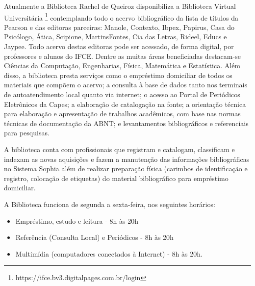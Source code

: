 \documentclass{paper}
\begin{document}
Atualmente a Biblioteca Rachel de Queiroz disponibiliza a Biblioteca Virtual Universitária \footnote{https://ifce.bv3.digitalpages.com.br/login} contemplando todo o acervo bibliográfico da lista de títulos da Pearson e das editoras parceiras: Manole, Contexto, Ibpex, Papirus, Casa do Psicólogo, Ática, Scipione, MartinsFontes, Cia das Letras, Rideel, Educs e Jaypee. Todo acervo destas editoras pode ser acessado, de forma digital, por professores e alunos do IFCE. Dentre as muitas áreas beneficiadas destacam-se Ciências da Computação, Engenharias, Física, Matemática e Estatística. Além disso, a biblioteca presta serviços como o empréstimo domiciliar de todos os materiais que compõem o acervo; a consulta à base de dados tanto nos terminais de autoatendimento local quanto via internet; o acesso ao Portal de Periódicos Eletrônicos da Capes; a elaboração de catalogação na fonte; a orientação técnica para elaboração e apresentação de trabalhos acadêmicos, com base nas normas técnicas de documentação da ABNT; e levantamentos bibliográficos e referenciais para pesquisas.

A biblioteca conta com profissionais que registram e catalogam, classificam e indexam as novas aquisições e fazem a manutenção das informações bibliográficas no Sistema Sophia além de realizar preparação física (carimbos de identificação e registro, colocação de etiquetas) do material bibliográfico para empréstimo domiciliar.

A Biblioteca funciona de segunda a sexta-feira, nos seguintes horários:

\begin{itemize}
\item Empréstimo, estudo e leitura - 8h às 20h
\item Referência (Consulta Local) e Periódicos - 8h às 20h
\item Multimídia (computadores conectados à Internet) - 8h às 20h.
\end{itemize}
\end{document}
